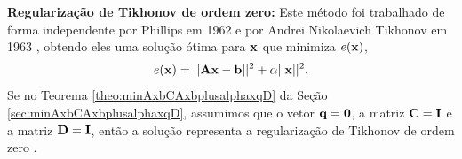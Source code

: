 \begin{tcbinformation} 
\textbf{Regularização de Tikhonov de ordem zero:} Este método foi trabalhado de forma independente
por Phillips em 1962 e por Andrei Nikolaevich Tikhonov em 1963 \cite[pp. 86]{kress2012numerical}, 
obtendo eles uma solução ótima para $\VECTOR{x}$  que minimiza $e(\VECTOR{x})$, 
\begin{equation}
e(\VECTOR{x})=||\MATRIX{A}\VECTOR{x}-\VECTOR{b}||^2+\alpha ||\VECTOR{x}||^2.
\end{equation}
Se no Teorema \ref{theo:minAxbCAxbplusalphaxqD} da  Seção \ref{sec:minAxbCAxbplusalphaxqD},
assumimos que o vetor $\VECTOR{q}=\VECTOR{0}$, a matriz $\MATRIX{C}=\MATRIX{I}$ e 
a matriz $\MATRIX{D}=\MATRIX{I}$,
então a solução representa a regularização de Tikhonov de ordem zero
\cite[pp. 94]{aster2013parameter} \cite[pp. 86]{kress2012numerical} \cite[pp. 117]{engl2000regularization}.
\end{tcbinformation} 

